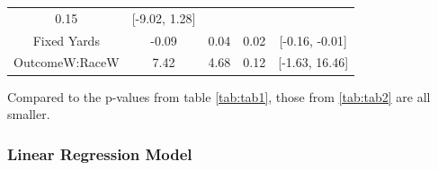 \documentclass[12pt,twoside]{reedthesis}
\begin{document}
\begin{longtable}[]{@{}ccccc@{}}
\begin{minipage}[t]{0.15\columnwidth}
0.15\strut
\end{minipage} & \begin{minipage}[t]{0.17\columnwidth}\centering\strut
{[}-9.02, 1.28{]}\strut
\end{minipage}\tabularnewline
\begin{minipage}[t]{0.25\columnwidth}\centering\strut
Fixed Yards\strut
\end{minipage} & \begin{minipage}[t]{0.15\columnwidth}\centering\strut
-0.09\strut
\end{minipage} & \begin{minipage}[t]{0.15\columnwidth}\centering\strut
0.04\strut
\end{minipage} & \begin{minipage}[t]{0.15\columnwidth}\centering\strut
0.02\strut
\end{minipage} & \begin{minipage}[t]{0.17\columnwidth}\centering\strut
{[}-0.16, -0.01{]}\strut
\end{minipage}\tabularnewline
\begin{minipage}[t]{0.25\columnwidth}\centering\strut
OutcomeW:RaceW\strut
\end{minipage} & \begin{minipage}[t]{0.15\columnwidth}\centering\strut
7.42\strut
\end{minipage} & \begin{minipage}[t]{0.15\columnwidth}\centering\strut
4.68\strut
\end{minipage} & \begin{minipage}[t]{0.15\columnwidth}\centering\strut
0.12\strut
\end{minipage} & \begin{minipage}[t]{0.17\columnwidth}\centering\strut
{[}-1.63, 16.46{]}\strut
\end{minipage}\tabularnewline
\bottomrule
\end{longtable}
Compared to the p-values from table \ref{tab:tab1}, those from
\ref{tab:tab2} are all smaller.

\subsubsection{Linear Regression Model}\label{linear-regression-model}
\end{document}

